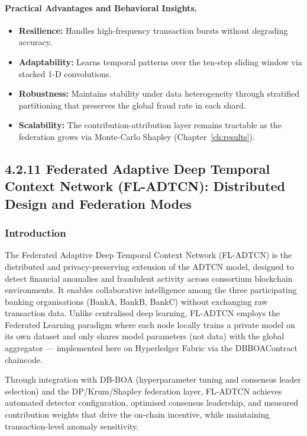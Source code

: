 \paragraph{Practical Advantages and Behavioral Insights.}
\begin{itemize}
    \item \textbf{Resilience:} Handles high-frequency transaction bursts without degrading accuracy.
    \item \textbf{Adaptability:} Learns temporal patterns over the ten-step sliding window via stacked 1-D convolutions.
    \item \textbf{Robustness:} Maintains stability under data heterogeneity through stratified partitioning that preserves the global fraud rate in each shard.
    \item \textbf{Scalability:} The contribution-attribution layer remains tractable as the federation grows via Monte-Carlo Shapley (Chapter~\ref{ch:results}).
\end{itemize}

\subsection*{4.2.11 Federated Adaptive Deep Temporal Context Network (FL-ADTCN): Distributed Design and Federation Modes}

\subsubsection*{Introduction}
The Federated Adaptive Deep Temporal Context Network (FL-ADTCN) is the distributed and privacy-preserving extension of the ADTCN model, designed to detect financial anomalies and fraudulent activity across consortium blockchain environments. It enables collaborative intelligence among the three participating banking organisations (BankA, BankB, BankC) without exchanging raw transaction data. Unlike centralised deep learning, FL-ADTCN employs the Federated Learning paradigm where each node locally trains a private model on its own dataset and only shares model parameters (not data) with the global aggregator — implemented here on Hyperledger Fabric via the DBBOAContract chaincode.

Through integration with DB-BOA (hyperparameter tuning and consensus leader selection) and the DP/Krum/Shapley federation layer, FL-ADTCN achieves automated detector configuration, optimised consensus leadership, and measured contribution weights that drive the on-chain incentive, while maintaining transaction-level anomaly sensitivity.

